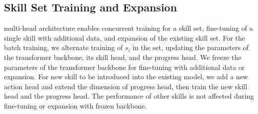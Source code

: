 \subsection{Skill Set Training and Expansion}






\ours multi-head architecture enables concurrent training for a skill set, fine-tuning of a single skill with additional data, and expansion of the existing skill set. For the batch training, we alternate training of  $s_i$ in the set, updating the parameters of the transformer backbone, its skill head, and the progress head. We freeze the parameters of the transformer backbone for fine-tuning with additional data or expansion. For new skill to be introduced into the existing model, we add a new action head and extend the dimension of progress head, then train the new skill head and the progress head. The performance of other skills is not affected during fine-tuning or expansion with frozen backbone.  